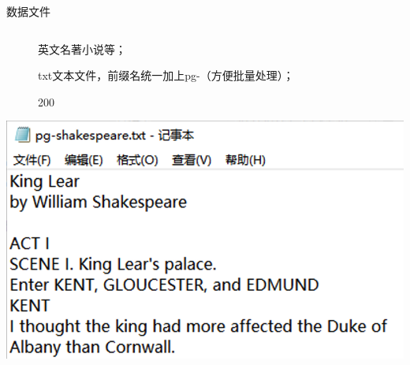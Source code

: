 \begin{frame}{\begin{CJK}{UTF8}{gkai}
			数据文件
	\end{CJK}}
	
	\begin{columns}
		\begin{column}{0.5\textwidth}
			\begin{description} 
				\item[\begin{CJK}{UTF8}{gkai}
					数据来源
				\end{CJK}] 
				\begin{CJK}{UTF8}{gkai}
					英文名著小说等；
					
				\end{CJK}
				\item[\begin{CJK}{UTF8}{gkai}
					文件格式
				\end{CJK}] 
				\begin{CJK}{UTF8}{gkai}
					txt文本文件，前缀名统一加上pg-（方便批量处理）；\\
					
				\end{CJK}
			
				\item[\begin{CJK}{UTF8}{gkai}
					文件数量
				\end{CJK}] 
				\begin{CJK}{UTF8}{gkai}
					200\\
					
				\end{CJK}
			\end{description}
		
		\centerline{\includegraphics[width = 1.05\textwidth]{Figures/lier.png}}
		\end{column}
		

\end{columns}
\end{frame}
